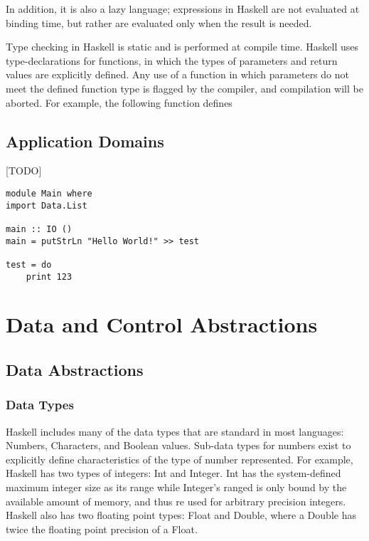 \documentclass[titlepage,12pt]{article}
\begin{document}
In addition, it is also a lazy language; expressions in Haskell are not evaluated at binding time, but rather are evaluated only when the result is needed. 

Type checking in Haskell is static and is performed at compile time. Haskell uses type-declarations for functions, in which the types of parameters and return values are explicitly defined. Any use of a function in which parameters do not meet the defined function type is flagged by the compiler, and compilation will be aborted. For example, the following function defines 

\subsection{Application Domains}



[TODO]~\cite{learnyouahaskell}
\begin{verbatim}
module Main where
import Data.List

main :: IO ()
main = putStrLn "Hello World!" >> test

test = do 
    print 123
\end{verbatim}

\section{Data and Control Abstractions}


\subsection{Data Abstractions}
\subsubsection{Data Types}

Haskell includes many of the data types that are standard in most languages: Numbers, Characters, and Boolean values. Sub-data types for numbers exist to explicitly define characteristics of the type of number represented. For example, Haskell has two types of integers: Int and Integer. Int has the system-defined maximum integer size as its range while Integer’s ranged is only bound by the available amount of memory, and thus re used for arbitrary precision integers. Haskell also has two floating point types: Float and Double, where a Double has twice the floating point precision of a Float.  
\end{document}
